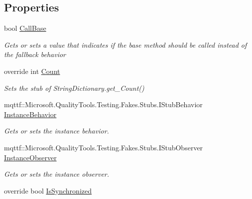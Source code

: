 \subsection*{Properties}
\begin{DoxyCompactItemize}
\item 
bool \hyperlink{class_system_1_1_collections_1_1_specialized_1_1_fakes_1_1_stub_string_dictionary_a74232cb9f8c6870ce1af5920504f0a76}{Call\-Base}
\begin{DoxyCompactList}\small\item\em Gets or sets a value that indicates if the base method should be called instead of the fallback behavior\end{DoxyCompactList}\item 
override int \hyperlink{class_system_1_1_collections_1_1_specialized_1_1_fakes_1_1_stub_string_dictionary_a5b7625b513097813319b6dd2a0118d2f}{Count}
\begin{DoxyCompactList}\small\item\em Sets the stub of String\-Dictionary.\-get\-\_\-\-Count()\end{DoxyCompactList}\item 
mqttf\-::\-Microsoft.\-Quality\-Tools.\-Testing.\-Fakes.\-Stubs.\-I\-Stub\-Behavior \hyperlink{class_system_1_1_collections_1_1_specialized_1_1_fakes_1_1_stub_string_dictionary_a95fba2c59f29b288382f44efa4178b99}{Instance\-Behavior}
\begin{DoxyCompactList}\small\item\em Gets or sets the instance behavior.\end{DoxyCompactList}\item 
mqttf\-::\-Microsoft.\-Quality\-Tools.\-Testing.\-Fakes.\-Stubs.\-I\-Stub\-Observer \hyperlink{class_system_1_1_collections_1_1_specialized_1_1_fakes_1_1_stub_string_dictionary_a23d69e87f699e08c1e2f89f2b3b5436a}{Instance\-Observer}
\begin{DoxyCompactList}\small\item\em Gets or sets the instance observer.\end{DoxyCompactList}\item 
override bool \hyperlink{class_system_1_1_collections_1_1_specialized_1_1_fakes_1_1_stub_string_dictionary_a4a8c034237ac0de9b7c197e43aaff723}{Is\-Synchronized}

\end{DoxyCompactItemize}
